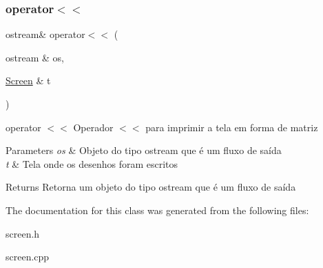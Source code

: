 \subsubsection{\texorpdfstring{operator$<$$<$}{operator<<}}
{\footnotesize\ttfamily ostream\& operator$<$$<$ (\begin{DoxyParamCaption}\item[{ostream \&}]{os,  }\item[{\mbox{\hyperlink{class_screen}{Screen}} \&}]{t }\end{DoxyParamCaption})\hspace{0.3cm}{\ttfamily [friend]}}



operator $<$$<$ Operador $<$$<$ para imprimir a tela em forma de matriz 


\begin{DoxyParams}{Parameters}
{\em os} & Objeto do tipo ostream que é um fluxo de saída \\
\hline
{\em t} & Tela onde os desenhos foram escritos \\
\hline
\end{DoxyParams}
\begin{DoxyReturn}{Returns}
Retorna um objeto do tipo ostream que é um fluxo de saída 
\end{DoxyReturn}


The documentation for this class was generated from the following files\+:\begin{DoxyCompactItemize}
\item 
screen.\+h\item 
screen.\+cpp\end{DoxyCompactItemize}
